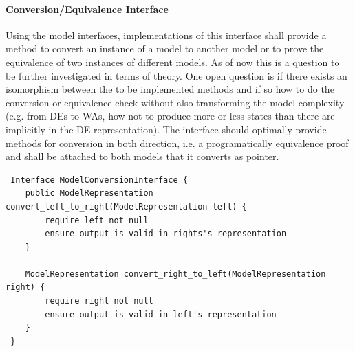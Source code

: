 			
			\paragraph{Conversion/Equivalence Interface}
                Using the model interfaces, implementations of this interface shall provide a method to convert an instance of a model to another model or to prove the equivalence of two instances of different models. As of now this is a question to be further investigated in terms of theory. One open question is if there exists an isomorphism between the to be implemented methods and if so how to do the conversion or equivalence check without also transforming the model complexity (e.g. from DEs to WAs, how not to produce more or less states than there are implicitly in the DE representation). The interface should optimally provide methods for conversion in both direction, i.e. a programatically equivalence proof and shall be attached to both models that it converts as pointer.
\begin{verbatim}
 Interface ModelConversionInterface {
    public ModelRepresentation convert_left_to_right(ModelRepresentation left) {
        require left not null
        ensure output is valid in rights's representation
    }
    
    ModelRepresentation convert_right_to_left(ModelRepresentation right) {
        require right not null
        ensure output is valid in left's representation
    }
 }
\end{verbatim}


